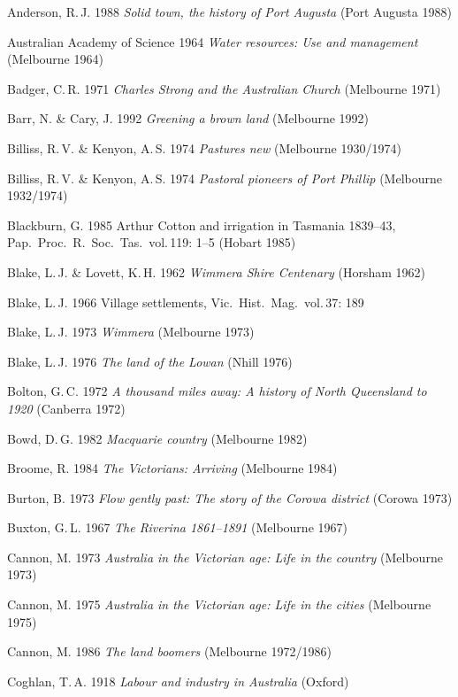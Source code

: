 Anderson, R.\,J. 1988 \textit{Solid town, the history of Port Augusta}
(Port Augusta 1988)

Australian Academy of Science 1964 \textit{Water resources: Use and
management} (Melbourne 1964)

Badger, C.\,R. 1971 \textit{Charles Strong and the Australian Church}
(Melbourne 1971)

Barr, N. \& Cary, J. 1992 \textit{Greening a brown land} (Melbourne
1992)

Billiss, R.\,V. \& Kenyon, A.\,S. 1974 \textit{Pastures new}
(Melbourne 1930/1974)

Billiss, R.\,V. \& Kenyon, A.\,S. 1974 \textit{Pastoral pioneers of
Port Phillip} (Melbourne 1932/1974)

Blackburn, G. 1985 Arthur Cotton and irrigation in Tasmania 1839--43,
Pap.\ Proc.\ R.~Soc.\ Tas.\ vol.\,119: 1--5 (Hobart 1985)

Blake, L.\,J. \& Lovett, K.\,H. 1962 \textit{Wimmera Shire Centenary}
(Horsham 1962)

Blake, L.\,J. 1966 Village settlements, Vic.\ Hist.\ Mag.\ vol.\,37: 189

Blake, L.\,J. 1973 \textit{Wimmera} (Melbourne 1973)

Blake, L.\,J. 1976 \textit{The land of the Lowan} (Nhill 1976)

Bolton, G.\,C. 1972 \textit{A thousand miles away: A history of North
Queensland to 1920} (Canberra 1972)

Bowd, D.\,G. 1982 \textit{Macquarie country} (Melbourne 1982)

Broome, R. 1984 \textit{The Victorians: Arriving} (Melbourne 1984)

Burton, B.  1973 \textit{Flow gently past: The story of the Corowa
district} (Corowa 1973)

Buxton, G.\,L. 1967 \textit{The Riverina 1861--1891} (Melbourne 1967)

Cannon, M. 1973 \textit{Australia in the Victorian age: Life in the country}
(Melbourne 1973)

Cannon, M. 1975 \textit{Australia in the Victorian age: Life in the
cities} (Melbourne 1975)

Cannon, M. 1986 \textit{The land boomers} (Melbourne 1972/1986)

Coghlan, T.\,A. 1918 \textit{Labour and industry in Australia} (Oxford)

